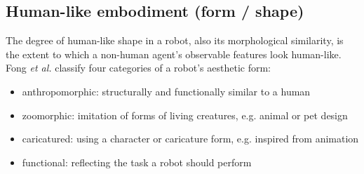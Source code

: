 \documentclass[twocolumn]{svjour3}          %
\begin{document}
\subsection{Human-like embodiment (form / shape)}
\label{sec:4.1}

	The degree of human-like shape in a robot, also its morphological similarity, is the extent to which a non-human agent's observable features look human-like. \cite{epley_seeing_2007} Fong \textit{et al.} classify four categories of a robot's aesthetic form: \cite{fong_survey_2003}
	
\begin{itemize}
	\item anthropomorphic: structurally and functionally similar to a human
	\item zoomorphic: imitation of forms of living creatures, e.g. animal or pet design
	\item caricatured: using a character or caricature form, e.g. inspired from animation
	\item functional: reflecting the task a robot should perform
\end{itemize}
\end{document}
